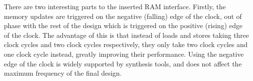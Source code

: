 
There are two interesting parts to the inserted RAM interface.  Firstly, the
memory updates are triggered on the negative (falling) edge of the clock, out of
phase with the rest of the design which is triggered on the positive (rising)
edge of the clock.  The advantage of this is that instead of loads and stores
taking three clock cycles and two clock cycles respectively, they only take two
clock cycles and one clock cycle instead, greatly improving their
performance. %
Using the negative edge of the clock is widely supported by synthesis tools, and
does not affect the maximum frequency of the final design.

